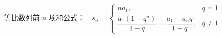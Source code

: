 \[
\text{等比数列前 }n\text{ 项和公式：}\quad
s_n=
\begin{cases}
na_1, & q=1 \\[8pt]
\dfrac{a_1(1-q^n)}{1-q}
=
\dfrac{a_1-a_nq}{1-q}, & q\ne 1
\end{cases}
\]